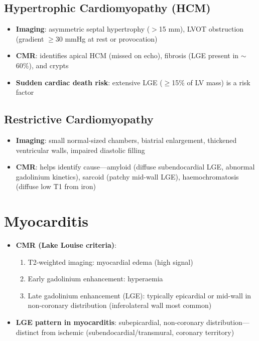 \subsection{Hypertrophic Cardiomyopathy (HCM)}
\begin{itemize}
  \item \textbf{Imaging}: asymmetric septal hypertrophy ($>$15 mm), LVOT obstruction (gradient $\geq$30 mmHg at rest or provocation)
  \item \textbf{CMR}: identifies apical HCM (missed on echo), fibrosis (LGE present in $\sim$60\%), and crypts
  \item \textbf{Sudden cardiac death risk}: extensive LGE ($\geq$15\% of LV mass) is a risk factor
\end{itemize}

\subsection{Restrictive Cardiomyopathy}
\begin{itemize}
  \item \textbf{Imaging}: small normal-sized chambers, biatrial enlargement, thickened ventricular walls, impaired diastolic filling
  \item \textbf{CMR}: helps identify cause---amyloid (diffuse subendocardial LGE, abnormal gadolinium kinetics), sarcoid (patchy mid-wall LGE), haemochromatosis (diffuse low T1 from iron)
\end{itemize}

\section{Myocarditis}
\begin{itemize}
  \item \textbf{CMR (Lake Louise criteria)}:
    \begin{enumerate}
      \item T2-weighted imaging: myocardial edema (high signal)
      \item Early gadolinium enhancement: hyperaemia
      \item Late gadolinium enhancement (LGE): typically epicardial or mid-wall in non-coronary distribution (inferolateral wall most common)
    \end{enumerate}
  \item \textbf{LGE pattern in myocarditis}: subepicardial, non-coronary distribution---distinct from ischemic (subendocardial/transmural, coronary territory)
\end{itemize}


